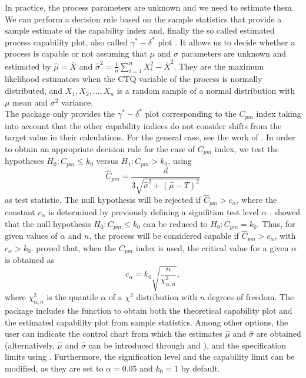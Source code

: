 In practice, the process parameters are unknown and we need to estimate them.  We can perform a decision rule based on the sample statistics that provide a sample estimate of the capability index and, finally the so called estimated process capability plot, also called  $\gamma^*-\delta^*$ plot \citep{deleryd1999process}. 
It allows us to decide whether a process is capable or not assuming that $\mu$ and $\sigma$ parameters are unknown and estimated by 
$\hat{\mu}=\bar{X}$ and $\hat{\sigma}^2=\frac{1}{n}\sum_{i=1}^n{X^2_i-\bar{X}^2}$. 
They are the maximum likelihood estimators when the CTQ variable of the process is normally distributed, and $ X_1,X_2,\dots,X_n$ is a random sample of a normal distribution with $\mu$ mean and $\sigma^2$ variance.\\
The  package only provides the $\gamma^*-\delta^*$ plot corresponding to the $C_{pm}$ index taking into account that the other capability indices do not consider shifts from the target value in their calculations. 
For the general case, see the work of \cite{vannman2001graphical}. 
In order to obtain an appropriate decision rule for the case of $C_{pm}$ index, we test the hypotheses $H_0 : C_{pm} \leq k_0$ versus $H_1 : C_{pm} > k_0$, using
$$\hat{C}_{pm}= \frac{d}{3\sqrt{\hat{\sigma}^2+\left( \hat{\mu} - T\right)^2}}$$ 
as test statistic. 
The null hypothesis will be rejected if $\hat{C}_{pm} > c_{\alpha}$, where the constant $c_{\alpha}$ is determined by previously defining a signifition test level $\alpha$ . 
\citet{vannman2001graphical} showed that the null hypothesis $H_0:C_{pm} \leq k_0$ can be reduced to $H_0:C_{pm}=k_0$. 
Thus, for given values of $\alpha$ and $n$, the process will be considered capable if $\hat{C}_{pm} > c_{\alpha}$, with $c_{\alpha} > k_0$. 
\citet{hubele2004effect} proved that, when the $C_{pm}$ index is used, the critical value for a given $\alpha$ is obtained as 
$$c_{\alpha}=k_0\sqrt{\frac{n}{\chi^2_{\alpha,n}}},$$
where $\chi^2_{\alpha,n}$ is the quantile $\alpha$ of a $\chi^2$ distribution with $n$ degrees of freedom.
The  package includes the  function to obtain both the theoretical capability plot and the estimated capability plot from sample statistics. 
Among other options, the user can indicate the control chart from which the estimates $\hat{\mu}$ and $\hat{\sigma}$ are obtained (alternatively, $\hat{\mu}$ and $\hat{\sigma}$ can be introduced through  and ), and the specification limits using . 
Furthermore, the signification level and the capability limit can be modified, as they are set to $\alpha=0.05$ and $k_0=1$ by default. 
